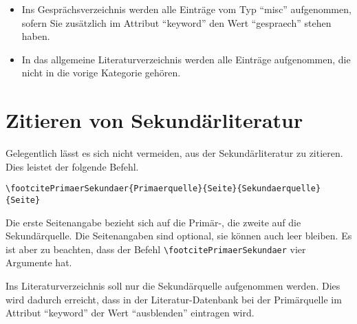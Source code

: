 \begin{itemize}
\item Ins Gesprächsverzeichnis werden alle Einträge vom Typ \enquote{misc} aufgenommen, sofern Sie zusätzlich im Attribut \enquote{keyword} den Wert \enquote{gespraech} stehen haben. 

\item In das allgemeine Literaturverzeichnis werden alle Einträge aufgenommen, die nicht in die vorige Kategorie gehören.
\end{itemize} 

\section{Zitieren von Sekundärliteratur}
Gelegentlich lässt es sich nicht vermeiden, aus der Sekundärliteratur zu zitieren. Dies leistet der folgende Befehl.
\begin{verbatim}
\footcitePrimaerSekundaer{Primaerquelle}{Seite}{Sekundaerquelle}{Seite}
\end{verbatim}
Die erste Seitenangabe bezieht sich auf die Primär-, die zweite auf die Sekundärquelle.
Die Seitenangaben sind optional, sie können auch leer bleiben.
Es ist aber zu beachten, dass der Befehl \verb|\footcitePrimaerSekundaer| vier Argumente hat.

Ins Literaturverzeichnis soll nur die Sekundärquelle aufgenommen werden. Dies wird dadurch erreicht, dass in der Literatur-Datenbank bei der Primärquelle im Attribut \enquote{keyword} der Wert \enquote{ausblenden} eintragen wird.
